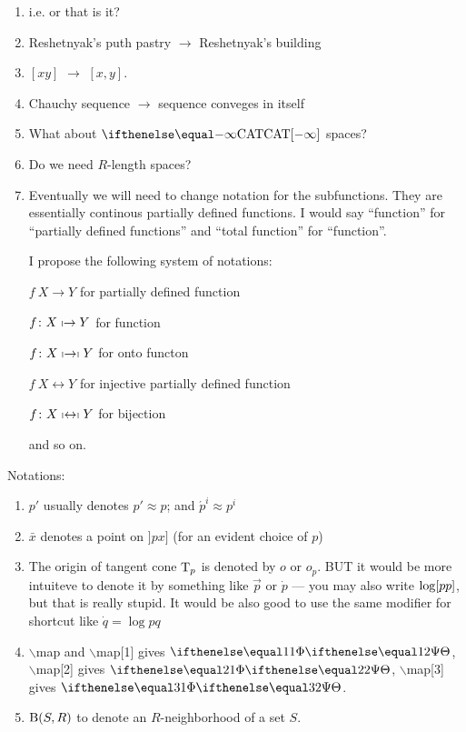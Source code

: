 \begin{enumerate}
\item i.e. or that is it?

\item Reshetnyak's puth pastry $\to$ Reshetnyak's building

\item $[xy]$ $\to$ $[x,y]$.

\item Chauchy sequence $\to$ sequence conveges in itself

\item What about $\CAT{-\infty}$ spaces?

\item Do we need $R$-length spaces?

\item Eventually we will need to change notation for the subfunctions.
They are essentially continous partially defined functions.
I would say ``function'' for ``partially defined functions''
and ``total function'' for ``function''.

I propose the following system of notations:

$f\:X\to Y$ for partially defined function

$f\:X\shortmid\to Y$ for function       

$f\:X\shortmid\to\shortmid Y$     for onto functon

$f\:X\leftrightarrow Y$      for injective partially defined function

$f\:X\shortmid\leftrightarrow\shortmid Y$     for bijection

and so on.

\end{enumerate}

Notations:
\begin{enumerate}
\item $p'$ usually denotes $p'\approx p$; 
and $\acute{p}^i\approx p^i$
\item $\bar x$ denotes a point on  $]p x]$ (for an evident choice of $p$)
\item The origin of tangent cone $\T_p$ is denoted by $o$ or $o_p$. BUT it would be more intuiteve to denote it by something like $\vec p$ or $\dot p$ --- you may also write $\ddir pp$, but that is really stupid.
It would be also good  to use the same modifier for shortcut like $\dot q=\log p q$
\item $\backslash$map and $\backslash$map[1] gives $\map$, $\backslash$map[2] gives $\map[2]$, $\backslash$map[3] gives $\map[3]$.
\item $\oBall(S,R)$  to denote an $R$-neighborhood of a set $S$.
\end{enumerate}

